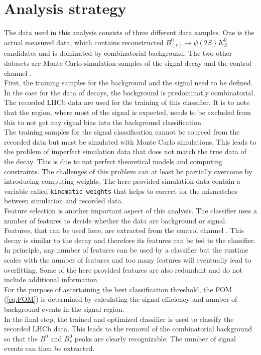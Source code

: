\section{Analysis strategy}
\label{sec:strategy}
The data used in this analysis consists of three different data samples. One is the actual measured data, which contains reconstructed $B^0_{(s)} \to \psi(2S)K^0_S$ \: candidates
and is dominated by combinatorial background. The two other datasets are Monte Carlo simulation samples of the signal decay \printBstoPsiKs \: 
and the control channel \printBdstoPsiKs. \\
First, the training samples for the background and the signal need to be defined. In the case for the data of \printBdstoPsiKs \: decays, the background is predominatly combinatorial. The recorded LHCb 
data are used for the training of this classifier. It is to note that the region, where most of the signal is expected, needs to be excluded from this to not get any signal bias into the background classification. \\
The training samples for the signal classification cannot be sourced from the recorded data but must be simulated with Monte Carlo simulations. This leads to the problem of imperfect simulation data 
that does not match the true data of the decay. This is due to not perfect theoretical models and computing constraints. The challenges of this problem can at least be partially overcome by introducing 
computing weights. The here provided simulation data contain a variable called \texttt{kinematic\_weights} that helps to correct for the mismatches between simulation and recorded data. \\
Feature selection is another important aspect of this analysis. The classifier uses a number of features to decide whether the data are background or signal. Features, that can be used here, are extracted
from the control channel \printBtoPsiKs. This decay is similar to the decay \printBstoPsiKs \: and therefore its features can be fed to the classifier.
In principle, any number of features can be used by a classifier but the runtime scales with the number of features and too many features will eventually lead to overfitting. Some of the here provided features
are also redundant and do not include additional information. \\
For the purpose of ascertaining the best classification threshold, the FOM (\autoref{eq:FOM}) is determined by calculating the signal efficiency and number of background events
in the signal region. \\
In the final step, the trained and optimized classifier is used to classify the recorded LHCb data. This leads to the removal of the combinatorial background so that the $B^0$ and $B^0_s$ peaks are clearly
recognizable. The number of signal events can then be extracted. 
